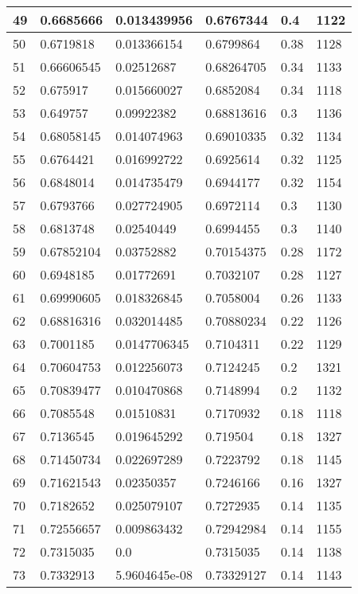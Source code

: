 \begin{longtable}{|l|l|l|l|l|l|}
49 & 0.6685666 & 0.013439956 & 0.6767344 & 0.4 & 1122 \\ \hline 
50 & 0.6719818 & 0.013366154 & 0.6799864 & 0.38 & 1128 \\ \hline 
51 & 0.66606545 & 0.02512687 & 0.68264705 & 0.34 & 1133 \\ \hline 
52 & 0.675917 & 0.015660027 & 0.6852084 & 0.34 & 1118 \\ \hline 
53 & 0.649757 & 0.09922382 & 0.68813616 & 0.3 & 1136 \\ \hline 
54 & 0.68058145 & 0.014074963 & 0.69010335 & 0.32 & 1134 \\ \hline 
55 & 0.6764421 & 0.016992722 & 0.6925614 & 0.32 & 1125 \\ \hline 
56 & 0.6848014 & 0.014735479 & 0.6944177 & 0.32 & 1154 \\ \hline 
57 & 0.6793766 & 0.027724905 & 0.6972114 & 0.3 & 1130 \\ \hline 
58 & 0.6813748 & 0.02540449 & 0.6994455 & 0.3 & 1140 \\ \hline 
59 & 0.67852104 & 0.03752882 & 0.70154375 & 0.28 & 1172 \\ \hline 
60 & 0.6948185 & 0.01772691 & 0.7032107 & 0.28 & 1127 \\ \hline 
61 & 0.69990605 & 0.018326845 & 0.7058004 & 0.26 & 1133 \\ \hline 
62 & 0.68816316 & 0.032014485 & 0.70880234 & 0.22 & 1126 \\ \hline 
63 & 0.7001185 & 0.0147706345 & 0.7104311 & 0.22 & 1129 \\ \hline 
64 & 0.70604753 & 0.012256073 & 0.7124245 & 0.2 & 1321 \\ \hline 
65 & 0.70839477 & 0.010470868 & 0.7148994 & 0.2 & 1132 \\ \hline 
66 & 0.7085548 & 0.01510831 & 0.7170932 & 0.18 & 1118 \\ \hline 
67 & 0.7136545 & 0.019645292 & 0.719504 & 0.18 & 1327 \\ \hline 
68 & 0.71450734 & 0.022697289 & 0.7223792 & 0.18 & 1145 \\ \hline 
69 & 0.71621543 & 0.02350357 & 0.7246166 & 0.16 & 1327 \\ \hline 
70 & 0.7182652 & 0.025079107 & 0.7272935 & 0.14 & 1135 \\ \hline 
71 & 0.72556657 & 0.009863432 & 0.72942984 & 0.14 & 1155 \\ \hline 
72 & 0.7315035 & 0.0 & 0.7315035 & 0.14 & 1138 \\ \hline 
73 & 0.7332913 & 5.9604645e-08 & 0.73329127 & 0.14 & 1143 \\ \hline 

\end{longtable}
